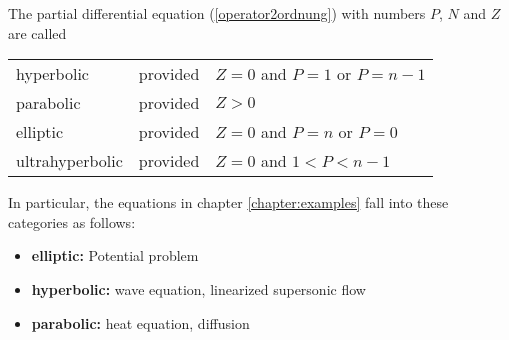 \begin{definition} The partial differential equation
(\ref{operator2ordnung})
with numbers $P$, $N$ and $Z$ are called
\begin{center}
\begin{tabular}{lcl}
hyperbolic&provided&$Z=0$ and $P=1$ or $P=n-1$\\
parabolic&provided&$Z>0$\\
elliptic&provided&$Z=0$ and $P=n$ or $P=0$\\
ultrahyperbolic&provided&$Z=0$ and $1<P<n-1$
\end{tabular}
\end{center}
\end{definition}
In particular, the equations in chapter \ref{chapter:examples}
fall into these categories as follows:
\begin{itemize}
\item {\bf elliptic:} Potential problem
\item {\bf hyperbolic:} wave equation, linearized supersonic flow
\item {\bf parabolic:} heat equation, diffusion
\end{itemize}

